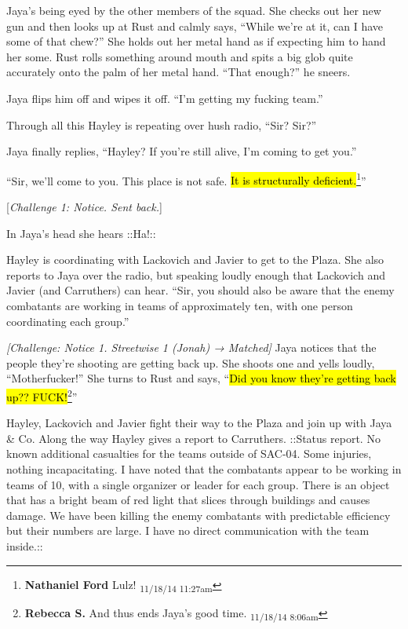 Jaya's being eyed by the other members of the squad.  She checks out her new gun and then looks up at Rust and calmly says, ``While we're at it, can I have some of that chew?''  She holds out her metal hand as if expecting him to hand her some.  Rust rolls something around mouth and spits a big glob quite accurately onto the palm of her metal hand.  ``That enough?'' he sneers.  

Jaya flips him off and wipes it off.  ``I'm getting my fucking team.''



Through all this Hayley is repeating over hush radio, ``Sir?  Sir?''

Jaya finally replies, ``Hayley?  If you're still alive, I'm coming to get you.''

``Sir, we'll come to you.  This place is not safe. \hl{It is structurally deficient.}\footnote{\textbf{Nathaniel Ford }Lulz! \textsubscript{11/18/14 11:27am}}''

{[}\textit{Challenge 1: Notice.  Sent back.}{]}

In Jaya's head she hears  {\color[RGB]{74,134,232}::Ha!::} 



Hayley is coordinating with Lackovich and Javier to get to the Plaza.  She also reports to Jaya over the radio, but speaking loudly enough that Lackovich and Javier (and Carruthers) can hear.  ``Sir, you should also be aware that the enemy combatants are working in teams of approximately ten, with one person coordinating each group.''



\textit{{[}Challenge: Notice 1.  Streetwise 1 (Jonah) → Matched{]}  }Jaya notices that the people they're shooting are getting back up.  She shoots one and yells loudly, ``Motherfucker!''  She turns to Rust and says, ``\hl{Did you know they're getting back up?? FUCK!}\footnote{\textbf{Rebecca S. }And thus ends Jaya's good time. \textsubscript{11/18/14 8:06am}}''



Hayley, Lackovich and Javier fight their way to the Plaza and join up with Jaya \& Co.  Along the way Hayley gives a report to Carruthers.   {\color[RGB]{230,145,56}::Status report.  No known additional casualties for the teams outside of SAC-04.  Some injuries, nothing incapacitating. I have noted that the combatants appear to be working in teams of 10, with a single organizer or leader for each group.  There is an object that has a bright beam of red light that slices through buildings and causes damage.  We have been killing the enemy combatants with predictable efficiency but their numbers are large.  I have no direct communication with the team inside.::}  {\color[RGB]{255,153,0} } 

